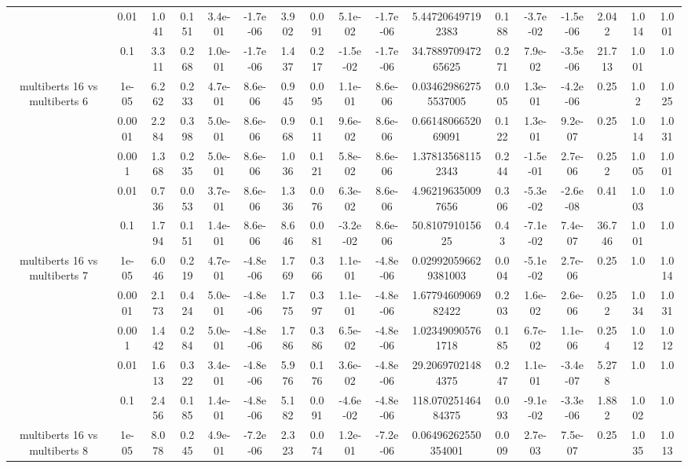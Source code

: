 \begin{tabular}{|c|c|c|c|c|c|c|c|c|c|c|c|c|c|c|c|c|}
 & 0.01 & 1.041 & 0.151 & 3.4e-01 & -1.7e-06 & 3.902 & 0.091 & 5.1e-02 & -1.7e-06 & 5.447206497192383 & 0.188 & -3.7e-02 & -1.5e-06 & 2.042 & 1.014 & 1.001 \\
 & 0.1 & 3.311 & 0.268 & 1.0e-01 & -1.7e-06 & 1.437 & 0.217 & -1.5e-02 & -1.7e-06 & 34.788970947265625 & 0.271 & 7.9e-02 & -3.5e-06 & 21.713 & 1.001 & 1.0 \\
\hline
\multirow{5}{*}{multiberts 16 vs multiberts 6} & 1e-05 & 6.262 & 0.233 & 4.7e-01 & 8.6e-06 & 0.945 & 0.095 & 1.1e-01 & 8.6e-06 & 0.034629862755537005 & 0.005 & 1.3e-01 & -4.2e-06 & 0.25 & 1.02 & 1.025 \\
 & 0.0001 & 2.284 & 0.398 & 5.0e-01 & 8.6e-06 & 0.968 & 0.111 & 9.6e-02 & 8.6e-06 & 0.6614806652069091 & 0.122 & 1.3e-01 & 9.2e-07 & 0.25 & 1.014 & 1.031 \\
 & 0.001 & 1.368 & 0.235 & 5.0e-01 & 8.6e-06 & 1.036 & 0.121 & 5.8e-02 & 8.6e-06 & 1.378135681152343 & 0.244 & -1.5e-01 & 2.7e-06 & 0.252 & 1.005 & 1.001 \\
 & 0.01 & 0.736 & 0.053 & 3.7e-01 & 8.6e-06 & 1.336 & 0.076 & 6.3e-02 & 8.6e-06 & 4.962196350097656 & 0.306 & -5.3e-02 & -2.6e-08 & 0.41 & 1.003 & 1.0 \\
 & 0.1 & 1.794 & 0.151 & 1.4e-01 & 8.6e-06 & 8.646 & 0.081 & -3.2e-02 & 8.6e-06 & 50.810791015625 & 0.43 & -7.1e-02 & 7.4e-07 & 36.746 & 1.001 & 1.0 \\
\hline
\multirow{5}{*}{multiberts 16 vs multiberts 7} & 1e-05 & 6.046 & 0.219 & 4.7e-01 & -4.8e-06 & 1.769 & 0.366 & 1.1e-01 & -4.8e-06 & 0.029920596629381003 & 0.004 & -5.1e-02 & 2.7e-06 & 0.25 & 1.0 & 1.014 \\
 & 0.0001 & 2.173 & 0.424 & 5.0e-01 & -4.8e-06 & 1.775 & 0.397 & 1.1e-01 & -4.8e-06 & 1.6779460906982422 & 0.203 & 1.6e-02 & 2.6e-06 & 0.252 & 1.034 & 1.031 \\
 & 0.001 & 1.442 & 0.284 & 5.0e-01 & -4.8e-06 & 1.786 & 0.386 & 6.5e-02 & -4.8e-06 & 1.023490905761718 & 0.185 & 6.7e-02 & 1.1e-06 & 0.254 & 1.012 & 1.012 \\
 & 0.01 & 1.613 & 0.322 & 3.4e-01 & -4.8e-06 & 5.976 & 0.176 & 3.6e-02 & -4.8e-06 & 29.20697021484375 & 0.247 & 1.1e-01 & -3.4e-07 & 5.278 & 1.0 & 1.0 \\
 & 0.1 & 2.456 & 0.185 & 1.4e-01 & -4.8e-06 & 5.182 & 0.091 & -4.6e-02 & -4.8e-06 & 118.07025146484375 & 0.093 & -9.1e-02 & -3.3e-06 & 1.882 & 1.002 & 1.0 \\
\hline
\multirow{5}{*}{multiberts 16 vs multiberts 8} & 1e-05 & 8.078 & 0.245 & 4.9e-01 & -7.2e-06 & 2.323 & 0.074 & 1.2e-01 & -7.2e-06 & 0.06496262550354001 & 0.009 & 2.7e-03 & 7.5e-07 & 0.25 & 1.035 & 1.013 \\

\end{tabular}
